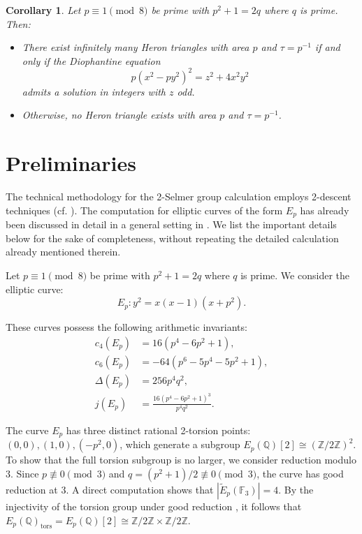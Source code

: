 \documentclass[10pt]{article}
\newtheorem{corollary}[theorem]{Corollary}
\begin{document}
\begin{corollary}\label{cor:heron}
Let \(p \equiv 1 \pmod{8}\) be prime with \(p^{2} + 1 = 2q\) where \(q\) is prime. Then:
\begin{itemize}
\item There exist infinitely many Heron triangles with area \(p\) and \(\tau = p^{-1}\) if and only if the Diophantine equation
\[p(x^{2} - py^{2})^{2} = z^{2} + 4x^{2}y^{2}\]
admits a solution in integers with \(z\) odd.
\item Otherwise, no Heron triangle exists with area \(p\) and \(\tau = p^{-1}\).
\end{itemize}
\end{corollary}

\section{Preliminaries}

The technical methodology for the 2-Selmer group calculation employs 2-descent techniques (cf. \cite{22}). The computation for elliptic curves of the form \(E_{p}\) has already been discussed in detail in a general setting in \cite{9}. We list the important details below for the sake of completeness, without repeating the detailed calculation already mentioned therein.

Let \(p \equiv 1 \pmod{8}\) be prime with \(p^{2} + 1 = 2q\) where \(q\) is prime. We consider the elliptic curve:
\[E_{p}: y^{2} = x(x - 1)(x + p^{2}).\]

These curves possess the following arithmetic invariants:
\begin{align*}
c_{4}(E_{p}) &= 16(p^{4} - 6p^{2} + 1),\\
c_{6}(E_{p}) &= -64(p^{6} - 5p^{4} - 5p^{2} + 1),\\
\Delta(E_{p}) &= 256p^{4}q^{2},\\
j(E_{p}) &= \frac{16(p^{4} - 6p^{2} + 1)^{3}}{p^{4}q^{2}}.
\end{align*}

The curve \(E_{p}\) has three distinct rational 2-torsion points: \((0,0), (1,0), (-p^{2},0)\), which generate a subgroup \(E_{p}(\mathbb{Q})[2] \cong (\mathbb{Z}/2\mathbb{Z})^{2}\). To show that the full torsion subgroup is no larger, we consider reduction modulo \(3\). Since \(p \not\equiv 0 \pmod{3}\) and \(q = (p^{2}+1)/2 \not\equiv 0 \pmod{3}\), the curve has good reduction at \(3\). A direct computation shows that \(|\tilde{E}_{p}(\mathbb{F}_{3})| = 4\). By the injectivity of the torsion group under good reduction \cite[Proposition VII.3.1]{22}, it follows that \(E_{p}(\mathbb{Q})_{\text{tors}} = E_{p}(\mathbb{Q})[2] \cong \mathbb{Z}/2\mathbb{Z} \times \mathbb{Z}/2\mathbb{Z}\).
\end{document}
